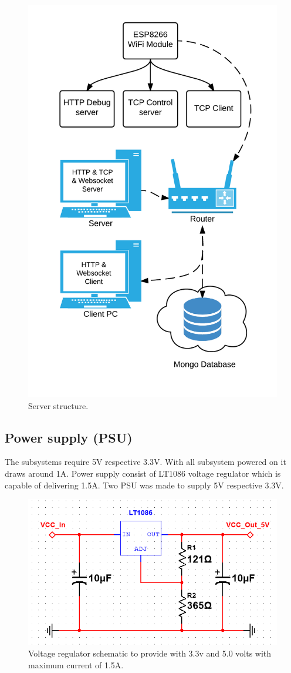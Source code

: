 \begin{figure}[p]
    \centering
    \includegraphics[width=0.8\linewidth]{server}
    \caption{Server structure.}
    \label{fig:arduino}
\end{figure}


\subsection{Power supply (PSU)}
The subsystems require 5V respective 3.3V. With all subsystem powered on it draws around 1A.
Power supply consist of LT1086 voltage regulator which is capable of delivering 1.5A.
Two PSU was made to supply 5V respective 3.3V.
\begin{figure}[p]
    \centering
    \includegraphics[width=0.8\linewidth]{voltage_regulator}
    \caption{Voltage regulator schematic to provide with 3.3v and 5.0 volts with maximum current of 1.5A.}
    \label{fig:voltage_regulator}
\end{figure}



